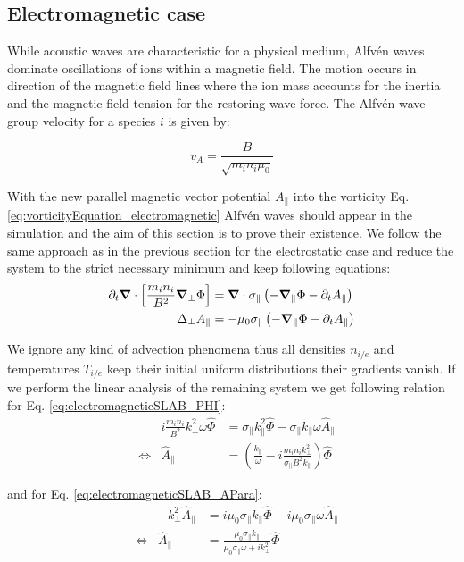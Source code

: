 \subsection{Electromagnetic case}
While acoustic waves are characteristic for a physical medium, Alfvén waves dominate oscillations of ions within a magnetic field. The motion occurs in direction of the magnetic field lines where the ion mass accounts for the inertia and the magnetic field tension for the restoring wave force. The Alfvén wave group velocity for a species $i$ is given by:

\begin{equation}
	v_A = \frac{B}{\sqrt{m_in_i\mu_0}} \label{eq:AlfvenGroupVelocity}
\end{equation}

With the new parallel magnetic vector potential $A_\parallel$ into the vorticity Eq. \ref{eq:vorticityEquation_electromagnetic} Alfvén waves should appear in the simulation and the aim of this section is to prove their existence. We follow the same approach as in the previous section for the electrostatic case and reduce the system to the strict necessary minimum and keep following equations: 
\begin{align}
	\partial_t\grad\cdot\left[\frac{m_in_i}{B^2}\grad_\perp\Phi\right] &= \grad\cdot\sigma_\parallel\left(-\grad_\parallel\Phi-\partial_tA_\parallel\right) \label{eq:electromagneticSLAB_PHI} \\
	\Delta_{\perp}A_\parallel &= -\mu_0\sigma_\parallel\left(-\grad_\parallel\Phi-\partial_tA_\parallel\right) \label{eq:electromagneticSLAB_APara}
\end{align}

We ignore any kind of advection phenomena thus all densities $n_{i/e}$ and temperatures $T_{i/e}$ keep their initial uniform distributions their gradients vanish. If we perform the linear analysis of the remaining system we get following relation for Eq. \ref{eq:electromagneticSLAB_PHI}:
\begin{align*}
	&&i\frac{m_in_i}{B^2}k_\perp^2\omega\hat{\Phi} &= \sigma_\parallel k_\parallel^2\hat{\Phi}-\sigma_\parallel k_\parallel\omega\hat{A}_\parallel \\
	&\Leftrightarrow& \hat{A}_\parallel &= \left(\frac{k_\parallel}{\omega} - i\frac{m_in_ik_\perp^2}{\sigma_\parallel B^2k_\parallel}\right)\hat{\Phi}
\end{align*}

and for Eq. \ref{eq:electromagneticSLAB_APara}:
\begin{align*}
	&&-k_\perp^2\hat{A}_\parallel &= i\mu_0\sigma_\parallel k_\parallel\hat{\Phi} - i\mu_0\sigma_\parallel\omega\hat{A}_\parallel \\
	&\Leftrightarrow&\hat{A}_\parallel &= \frac{\mu_0\sigma_\parallel k_\parallel}{\mu_0\sigma_\parallel\omega + i k_\perp^2}\hat{\Phi}
\end{align*}

